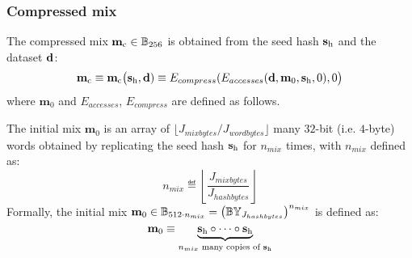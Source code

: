 \subsubsection{Compressed mix}
The compressed mix $\mathbf{m}_{\mathrm{c}} \in \mathbb{B}_{256}$ is obtained from the seed hash $\mathbf{s}_{\mathrm{h}}$ and the dataset $\mathbf{d}$:
\begin{equation}\label{eq:compress}
 \mathbf{m}_{\mathrm{c}} \equiv 
 \mathbf{m}_{\mathrm{c}}\big(\mathbf{s}_{\mathrm{h}},\mathbf{d}) \equiv E_{compress}(E_{accesses}(\mathbf{d}, \mathbf{m}_0, \mathbf{s}_{\mathrm{h}}, 0), 0\big)
\end{equation}
where $\mathbf{m}_0$ and $E_{accesses}$, $E_{compress}$ are defined as follows.

The initial mix $\mathbf{m}_0$ is an array of $\lfloor J_{mixbytes} / J_{wordbytes} \rfloor$ many $32$-bit (i.e. $4$-byte) words 
obtained by replicating the seed hash $\mathbf{s}_{\mathrm{h}}$ for $n_{mix}$ times, 
with $n_{mix}$ defined as:
\begin{equation}
	n_{mix}\eqdef  \left\lfloor \frac{J_{mixbytes}}{J_{hashbytes}}\right\rfloor
\end{equation}
Formally, the initial mix 
$\mathbf{m}_0 \in \mathbb{B}_{512 \cdot n_{mix}}
=\left(\mathbb{BY}_{J_{hashbytes}}\right)^{n_{mix}}$ is defined as:
\begin{equation}
	\mathbf{m}_0 \equiv \underbrace{\mathbf{s}_{\mathrm{h}} \circ \cdots \circ \mathbf{s}_{\mathrm{h}}}_{\text{$n_{mix}$ many copies of $\mathbf{s}_{\mathrm{h}}$}}
\end{equation}

